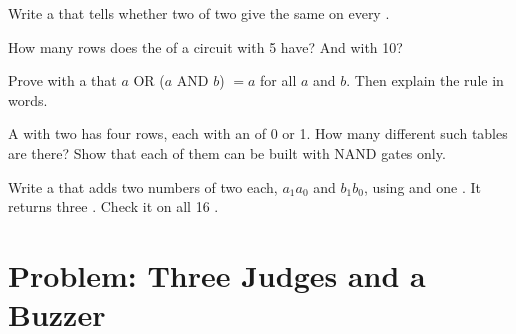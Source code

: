 \begin{exercise}[$\star\star$]\label{exo:g9:logic-gates:8}
Write a   that tells whether two  of two
 give the same  on every .
\end{exercise}

\begin{exercise}[$\star\star$]\label{exo:g9:logic-gates:9}
How many rows does the  of a circuit with 5  have? And with
10?
\end{exercise}

\begin{exercise}[$\star\star\star$]\label{exo:g9:logic-gates:10}
Prove with a  that $a$ OR ($a$ AND $b$) $= a$ for all  $a$ and
$b$. Then explain the rule in words.
\end{exercise}

\begin{exercise}[$\star\star\star$]\label{exo:g9:logic-gates:11}
A  with two  has four rows, each with an  of 0 or 1.
How many different such tables are there? Show that each of them can be built
with NAND gates only.
\end{exercise}

\begin{exercise}[$\star\star\star$]\label{exo:g9:logic-gates:12}
Write a   that adds two numbers of
two  each, $a_1a_0$ and $b_1b_0$, using  and one . It
returns three . Check it on all 16 .
\end{exercise}

\section{Problem: Three Judges and a Buzzer}

